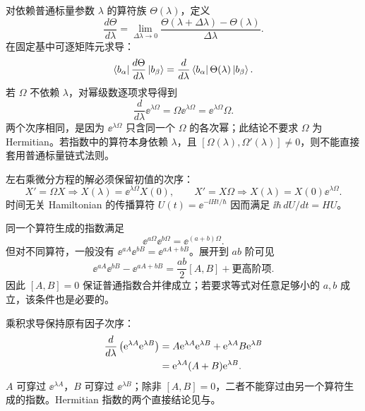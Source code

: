 对依赖普通标量参数 $\lambda$ 的算符族 $\Theta(\lambda)$，定义
\begin{equation}
  \frac{d\Theta}{d\lambda}
  =\lim_{\Delta\lambda\to0}
  \frac{\Theta(\lambda+\Delta\lambda)-\Theta(\lambda)}{\Delta\lambda}.
  \label{eq:QM-C01-S09-operator-derivative}
\end{equation}
在固定基中可逐矩阵元求导：
\[
  \left\langle b_\alpha\right|\frac{d\Theta}{d\lambda}\left|b_\beta\right\rangle
  =\frac{d}{d\lambda}
  \left\langle b_\alpha\right|\Theta(\lambda)\left|b_\beta\right\rangle.
\]
若 $\Omega$ 不依赖 $\lambda$，对幂级数逐项求导得到
\begin{equation}
  \frac{d}{d\lambda}\ee^{\lambda\Omega}
  =\Omega\ee^{\lambda\Omega}
  =\ee^{\lambda\Omega}\Omega.
  \label{eq:QM-C01-S09-exponential-derivative}
\end{equation}
两个次序相同，是因为 $\ee^{\lambda\Omega}$ 只含同一个 $\Omega$ 的各次幂；此结论不要求 $\Omega$ 为 Hermitian。若指数中的算符本身依赖 $\lambda$，且 $[\Omega(\lambda),\Omega'(\lambda)]\neq0$，则不能直接套用普通标量链式法则。

左右乘微分方程的解必须保留初值的次序：
\begin{equation}
  X'=\Omega X
  \Rightarrow X(\lambda)=\ee^{\lambda\Omega}X(0),
  \qquad
  X'=X\Omega
  \Rightarrow X(\lambda)=X(0)\ee^{\lambda\Omega}.
  \label{eq:QM-C01-S09-left-right-ode}
\end{equation}
时间无关 Hamiltonian 的传播算符 $U(t)=\ee^{-\ii Ht/\hbar}$ 因而满足 $\ii\hbar\,dU/dt=HU$。


同一个算符生成的指数满足
\begin{equation}
  \ee^{a\Omega}\ee^{b\Omega}=\ee^{(a+b)\Omega}.
  \label{eq:QM-C01-S09-same-generator}
\end{equation}
但对不同算符，一般没有 $\ee^{aA}\ee^{bB}=\ee^{aA+bB}$。展开到 $ab$ 阶可见
\begin{equation}
  \ee^{aA}\ee^{bB}-\ee^{aA+bB}
  =\frac{ab}{2}[A,B]+\text{更高阶项}.
  \label{eq:QM-C01-S09-exponential-obstruction}
\end{equation}
因此 $[A,B]=0$ 保证普通指数合并律成立；若要求等式对任意足够小的 $a,b$ 成立，该条件也是必要的。

乘积求导保持原有因子次序：
\begin{align}
  \frac{d}{d\lambda}
  \left(\mathrm{e}^{\lambda A}\mathrm{e}^{\lambda B}\right)
  &=A\mathrm{e}^{\lambda A}\mathrm{e}^{\lambda B}
    +\mathrm{e}^{\lambda A}B\mathrm{e}^{\lambda B} \notag\\
  &=\mathrm{e}^{\lambda A}(A+B)\mathrm{e}^{\lambda B}.
  \label{eq:QM-C01-S09-product-derivative}
\end{align}
$A$ 可穿过 $\ee^{\lambda A}$，$B$ 可穿过 $\ee^{\lambda B}$；除非 $[A,B]=0$，二者不能穿过由另一个算符生成的指数。Hermitian 指数的两个直接结论见与。


